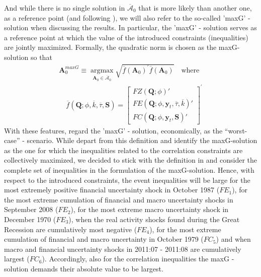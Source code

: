 \documentclass[a4paper,11pt,listof=nochaptergap,oneside,pointednumbers,bibtotoc,bigheadings,liststotoc,hidelinks]{scrbook}
\theoremstyle{mysatz}
\theoremstyle{mydefinition}
\theoremstyle{mytheorem}
\theoremstyle{mybemerkung}
\newcommand{\vect}[1]{\boldsymbol{\mathbf{#1}}}
\begin{document}
And while there is no single solution in $\overline{\vect{\mathcal{A}}}_0$ that is more likely than another one, as a reference point (and following \citealp{ludvigsonetal:18}), we will also refer to the so-called 'maxG' - solution when discussing the results. In particular, the 'maxG' - solution serves as a reference point at which the value of the introduced constraints (inequalities) are jointly maximized. Formally, the quadratic norm is chosen as the maxG-solution so that
\begin{equation} \label{eq:svar_ludvi16}
\begin{split}
\vect{A}_0^{maxG} \equiv \operatorname*{argmax}_{\vect{A}_0 \in \overline{\vect{\mathcal{A}}}_0} \sqrt{\overline{f}(\vect{A}_0)^'\overline{f}(\vect{A}_0)} \quad \text{where} \\
\quad \overline{f}(\vect{Q}; \phi, \overline{k}, \overline{\tau}, \vect{S}) = \begin{bmatrix}
			FZ(\vect{Q}; \phi)' \\
			FE(\vect{Q}; \phi, \vect{y}_t, \overline{\tau}, \overline{k})' \\
			FC(\vect{Q}; \phi, \vect{y}_t, \vect{S})'
		\end{bmatrix}^'
\end{split}								
\end{equation}
With these features, \citet{ludvigsonetal:18} regard the 'maxG' - solution, economically, as the ``worst-case'' - scenario. While \citet{ludvigsonetal:19} depart from this definition and identify the maxG-solution as the one for which the inequalities related to the correlation constraints are collectively maximized, we decided to stick with the definition in \citet{ludvigsonetal:18} and consider the complete set of inequalities in the formulation of the maxG-solution. Hence, with respect to the introduced constraints, the event inequalities will be large for the most extremely positive financial uncertainty shock in October 1987 ($FE_1$), for the most extreme cumulation of financial and macro uncertainty shocks in September 2008 ($FE_2$), for the most extreme macro uncertainty shock in December 1970 ($FE_3$), when the real activity shocks found during the Great Recession are cumulatively most negative ($FE_4$), for the most extreme cumulation of financial and macro uncertainty in October 1979 ($FC_5$) and when macro and financial uncertainty shocks in 2011:07 - 2011:08 are cumulatively largest ($FC_6$). Accordingly, also for the correlation inequalities the maxG -solution demands their absolute value to be largest.
\end{document}

